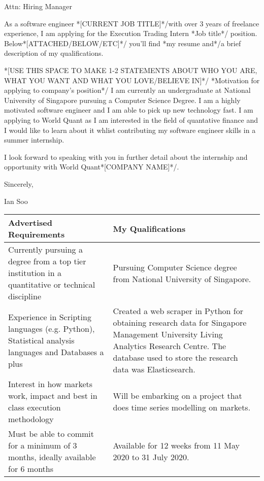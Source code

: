 \documentclass[11pt]{article} %
\begin{document}
\begin{flushleft}

Attn: Hiring Manager %

\bigskip

As a software engineer \/*[CURRENT JOB TITLE]*/with over 3 years of freelance experience, I am applying for the Execution Trading Intern \/*Job title*/ position. Below\/*[ATTACHED/BELOW/ETC]*/ you'll find \/*my resume and*/a brief description of my qualifications.

\medskip

\/*[USE THIS SPACE TO MAKE 1-2 STATEMENTS ABOUT WHO YOU ARE, WHAT YOU WANT AND WHAT YOU LOVE/BELIEVE IN]*/
\/*Motivation for applying to company's position*/
I am currently an undergraduate at National University of Singapore pursuing a Computer Science Degree. I am a highly motivated software engineer and I am able to pick up new technology fast.
I am applying to World Quant as I am interested in the field of quantative finance and I would like to learn about it whlist contributing my software engineer skills in a summer internship.

\medskip

I look forward to speaking with you in further detail about the internship and opportunity with World Quant\/*[COMPANY NAME]*/.

\bigskip

Sincerely, 

Ian Soo

\bigskip

\begin{table}[ht]
    \centering
    \begin{tabular}
    {
        >{\raggedright\arraybackslash}p{7cm} |
        >{\raggedright\arraybackslash}p{10cm}
    }
    \toprule
    \textbf{Advertised Requirements} & \textbf{My Qualifications}\\
    \midrule
    Currently pursuing a degree from a top tier institution in a quantitative or technical discipline & Pursuing Computer Science degree from National University of Singapore.\\
    \midrule
    Experience in Scripting languages (e.g. Python), Statistical analysis languages and Databases a plus & Created a web scraper in Python for obtaining research data for Singapore Management University Living Analytics Research Centre. The database used to store the research data was Elasticsearch.\\
    \midrule
    Interest in how markets work, impact and best in class execution methodology & Will be embarking on a project that does time series modelling on markets. \\
    \midrule
    Must be able to commit for a minimum of 3 months, ideally available for 6 months & Available for 12 weeks from 11 May 2020 to 31 July 2020.\\
    \bottomrule
    \end{tabular}
\end{table}

\end{flushleft}
\end{document}
